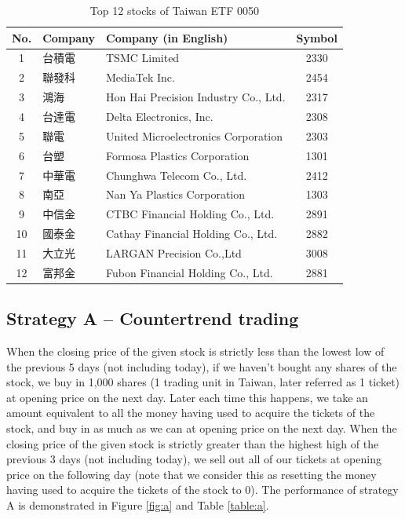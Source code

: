 \documentclass[12pt, letterpaper, oneside]{article}
\begin{document}
\begin{table}[h!]
    \centering
    \begin{tabular}{ |c|p{10ex}|p{40ex}|c| }
        \hline
        No. & Company & Company (in English) & Symbol \\ [0.5ex]
        \hline
        1 & 台積電 & TSMC Limited & 2330 \\
        2 & 聯發科 & MediaTek Inc. & 2454 \\
        3 & 鴻海 & Hon Hai Precision Industry Co., Ltd. & 2317 \\
        4 & 台達電 & Delta Electronics, Inc. & 2308 \\
        5 & 聯電 & United Microelectronics Corporation & 2303 \\
        6 & 台塑 & Formosa Plastics Corporation & 1301 \\
        7 & 中華電 & Chunghwa Telecom Co., Ltd. & 2412 \\
        8 & 南亞 & Nan Ya Plastics Corporation & 1303 \\
        9 & 中信金 & CTBC Financial Holding Co., Ltd. & 2891 \\
        10 & 國泰金 & Cathay Financial Holding Co., Ltd. & 2882 \\
        11 & 大立光 & LARGAN Precision Co.,Ltd & 3008 \\
        12 & 富邦金 & Fubon Financial Holding Co., Ltd. & 2881 \\ [0.5ex]
        \hline
    \end{tabular}
    \caption{Top 12 stocks of Taiwan ETF 0050}
    \label{table:stock}
\end{table}

\subsection{Strategy A -- Countertrend trading}
When the closing price of the given stock is strictly less than the lowest low of the previous 5 days (not including today), if we haven't bought any shares of the stock, we buy in 1,000 shares (1 trading unit in Taiwan, later referred as 1 ticket) at opening price on the next day. Later each time this happens, we take an amount equivalent to all the money having used to acquire the tickets of the stock, and buy in as much as we can at opening price on the next day. When the closing price of the given stock is strictly greater than the highest high of the previous 3 days (not including today), we sell out all of our tickets at opening price on the following day (note that we consider this as resetting the money having used to acquire the tickets of the stock to 0). The performance of strategy A is demonstrated in Figure \ref{fig:a} and Table \ref{table:a}.
\end{document}
